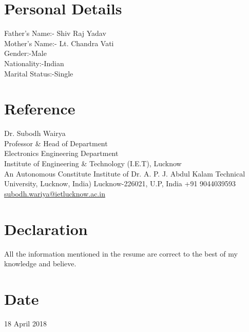 \documentclass[12pt]{article}
\begin{document}
\section*{Personal Details}
{\large {Father's Name:- \hspace{1.1cm} Shiv Raj Yadav\\
Mother's Name:- \hspace{1cm} Lt. Chandra Vati\\
Gender:-\hspace{2.9cm}Male\\
Nationality:-\hspace{2.0cm}Indian\\
Marital Status:-\hspace{1.4cm}Single\\
}}
\section*{\large {Reference}}
Dr. Subodh Wairya\\
Professor \& Head of Department\\
Electronics Engineering Department\\
Institute of Engineering \& Technology (I.E.T), Lucknow\\
An Autonomous Constitute Institute of Dr. A. P. J. Abdul Kalam Technical University, Lucknow, India)
Lucknow-226021, U.P, India
+91 9044039593\\
\href{subodh.wariya@ietlucknow.ac.in}{subodh.wariya@ietlucknow.ac.in}
\section*{\large {Declaration}}
All the information mentioned in the resume are correct to the best of my knowledge and believe.
\section*{\large {Date}}
18 April 2018
 
\end{document}
